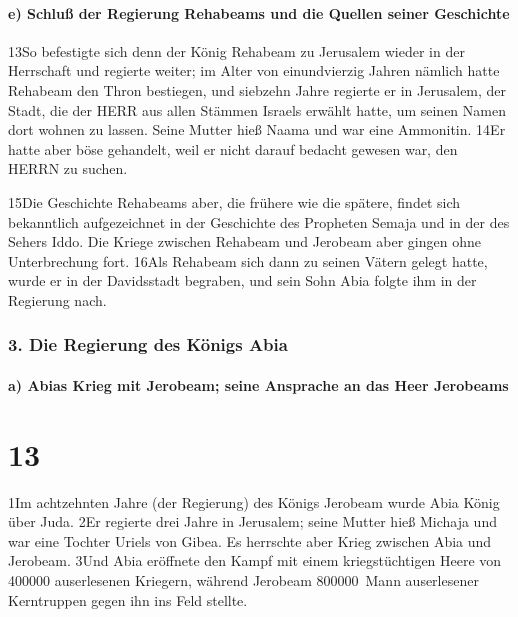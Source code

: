 \hypertarget{e-schluuxdf-der-regierung-rehabeams-und-die-quellen-seiner-geschichte}{%
\paragraph{e) Schluß der Regierung Rehabeams und die Quellen seiner
Geschichte}\label{e-schluuxdf-der-regierung-rehabeams-und-die-quellen-seiner-geschichte}}

13So befestigte sich denn der König Rehabeam zu Jerusalem wieder in der
Herrschaft und regierte weiter; im Alter von einundvierzig Jahren
nämlich hatte Rehabeam den Thron bestiegen, und siebzehn Jahre regierte
er in Jerusalem, der Stadt, die der HERR aus allen Stämmen Israels
erwählt hatte, um seinen Namen dort wohnen zu lassen. Seine Mutter hieß
Naama und war eine Ammonitin. 14Er hatte aber böse gehandelt, weil er
nicht darauf bedacht gewesen war, den HERRN zu suchen.

15Die Geschichte Rehabeams aber, die frühere wie die spätere, findet
sich bekanntlich aufgezeichnet in der Geschichte des Propheten Semaja
und in der des Sehers Iddo. Die Kriege zwischen Rehabeam und Jerobeam
aber gingen ohne Unterbrechung fort. 16Als Rehabeam sich dann zu seinen
Vätern gelegt hatte, wurde er in der Davidsstadt begraben, und sein Sohn
Abia folgte ihm in der Regierung nach.

\hypertarget{die-regierung-des-kuxf6nigs-abia}{%
\subsubsection{3. Die Regierung des Königs
Abia}\label{die-regierung-des-kuxf6nigs-abia}}

\hypertarget{a-abias-krieg-mit-jerobeam-seine-ansprache-an-das-heer-jerobeams}{%
\paragraph{a) Abias Krieg mit Jerobeam; seine Ansprache an das Heer
Jerobeams}\label{a-abias-krieg-mit-jerobeam-seine-ansprache-an-das-heer-jerobeams}}

\hypertarget{section-12}{%
\section{13}\label{section-12}}

1Im achtzehnten Jahre (der Regierung) des Königs Jerobeam wurde Abia
König über Juda. 2Er regierte drei Jahre in Jerusalem; seine Mutter hieß
Michaja und war eine Tochter Uriels von Gibea. Es herrschte aber Krieg
zwischen Abia und Jerobeam. 3Und Abia eröffnete den Kampf mit einem
kriegstüchtigen Heere von 400000 auserlesenen Kriegern, während Jerobeam
800000~Mann auserlesener Kerntruppen gegen ihn ins Feld stellte.

